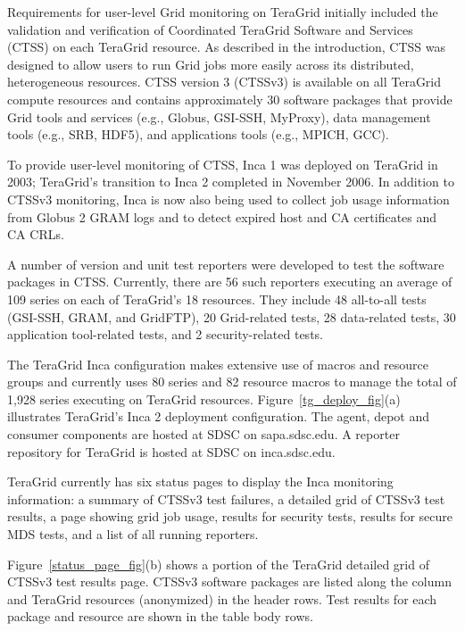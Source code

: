 \documentclass{sig-alternate}
\begin{document}
Requirements for user-level Grid monitoring on TeraGrid initially included the
validation and verification of Coordinated TeraGrid Software and Services (CTSS) 
on each TeraGrid resource.  As described in the introduction, CTSS was designed to
allow users to run Grid jobs more easily across its distributed, heterogeneous
resources.  CTSS version 3 (CTSSv3) is available on all TeraGrid compute
resources and contains approximately 30 software packages that provide
Grid tools and services (e.g., Globus, GSI-SSH, MyProxy), data management
tools (e.g., SRB, HDF5), and applications tools (e.g., MPICH, GCC).

To provide user-level monitoring of CTSS, Inca 1 was deployed on TeraGrid in
2003; TeraGrid's transition to Inca 2 completed in
November 2006.  In addition to CTSSv3 monitoring, Inca is now also being used
to collect job usage information from Globus 2 GRAM logs and to detect expired
host and CA certificates and CA CRLs. 

A number of version and unit test reporters were developed to test the software packages in CTSS.
Currently, there are 56 such reporters executing an average of 109 series on
each of TeraGrid's 18 resources.  They include 48 all-to-all tests (GSI-SSH,
GRAM, and GridFTP), 20 Grid-related tests, 28 data-related tests, 30
application tool-related tests, and 2 security-related tests.  

The TeraGrid
Inca configuration makes extensive use of macros and resource groups and
currently uses 80 series and 82 resource macros to manage the total of 1,928
series executing on TeraGrid resources.
Figure~\ref{tg_deploy_fig}(a) illustrates TeraGrid's Inca 2 deployment
configuration.  The
agent, depot and consumer components are hosted at SDSC on 
sapa.sdsc.edu.  A reporter repository for TeraGrid is hosted
at SDSC on inca.sdsc.edu.  

TeraGrid currently has six status pages to display the Inca monitoring
information: a summary of CTSSv3 test failures, a detailed grid of CTSSv3 test
results, a page showing grid job
usage, results for security tests, results for secure MDS tests, and a list of
all running reporters.

Figure~\ref{status_page_fig}(b) shows a portion of the TeraGrid detailed grid of
CTSSv3 test results
page.  CTSSv3 software packages are listed along the column and TeraGrid
resources (anonymized) in the header rows.  Test results for each package and
resource are shown in the table body rows.
\end{document}
